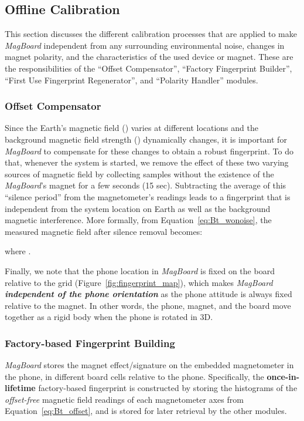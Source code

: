 \documentclass[conference]{IEEEtran}
\def \sys {\textit{MagBoard}}
\begin{document}
\subsection{Offline Calibration}

This section discusses the different calibration processes that are applied to make \sys{} independent from any surrounding environmental noise, changes in magnet polarity, and the characteristics of the used device or magnet. These are the responsibilities of the ``Offset Compensator'', ``Factory Fingerprint Builder'', ``First Use Fingerprint Regenerator'', and ``Polarity Handler'' modules.

\subsubsection{Offset Compensator}
\label{sec:offset_comp}

Since the Earth's magnetic field  () varies at different locations and the background magnetic field strength () dynamically changes, it is important for \sys{} to compensate for these changes to obtain a robust fingerprint. To do that, whenever the system is started, we remove the effect of these two varying sources of magnetic field by collecting samples without the existence of the \sys{}'s magnet for a few seconds (15 sec). Subtracting the average of this ``silence period'' from the magnetometer's readings leads to a fingerprint that is independent from the system location on Earth as well as the background magnetic interference. 
More formally, from Equation~\ref{eq:Bt_wonoise}, the measured magnetic field after silence removal becomes:



where .

Finally, we note that the phone location in \sys{} is fixed on the board relative to the grid (Figure~\ref{fig:fingerprint_map}), which 
makes \sys{} \textbf{\emph{independent of the phone orientation}} as the phone attitude is always fixed relative to the magnet. In other words, the phone, magnet, and the board move together as a rigid body when the phone is rotated in 3D.

\subsubsection{Factory-based Fingerprint Building}

\sys{} stores the magnet effect/signature on the embedded magnetometer in the phone, in different board cells relative to the phone. Specifically, the \textbf{once-in-lifetime} factory-based fingerprint  is constructed by storing the histograms of the \emph{offset-free} magnetic field readings of each magnetometer axes from Equation~\ref{eq:Bt_offset}, and is stored for later retrieval by the other modules. 
\end{document}
